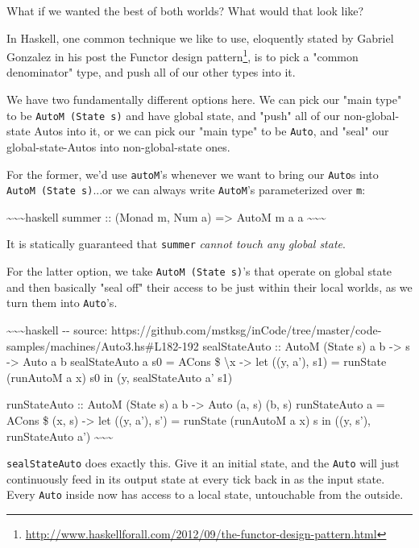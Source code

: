 \documentclass[]{article}
\renewcommand{\href}[2]{#2\footnote{\url{#1}}}
\begin{document}
What if we wanted the best of both worlds? What would that look like?

In Haskell, one common technique we like to use, eloquently stated by Gabriel
Gonzalez in his post
\href{http://www.haskellforall.com/2012/09/the-functor-design-pattern.html}{the
Functor design pattern}, is to pick a "common denominator" type, and push all of
our other types into it.

We have two fundamentally different options here. We can pick our "main type" to
be \texttt{AutoM\ (State\ s)} and have global state, and "push" all of our
non-global-state Autos into it, or we can pick our "main type" to be
\texttt{Auto}, and "seal" our global-state-Autos into non-global-state ones.

For the former, we'd use \texttt{autoM}'s whenever we want to bring our
\texttt{Auto}s into \texttt{AutoM\ (State\ s)}...or we can always write
\texttt{AutoM}'s parameterized over \texttt{m}:

\textasciitilde{}\textasciitilde{}\textasciitilde{}haskell summer :: (Monad m,
Num a) =\textgreater{} AutoM m a a
\textasciitilde{}\textasciitilde{}\textasciitilde{}

It is statically guaranteed that \texttt{summer} \emph{cannot touch any global
state}.

For the latter option, we take \texttt{AutoM\ (State\ s)}'s that operate on
global state and then basically "seal off" their access to be just within their
local worlds, as we turn them into \texttt{Auto}'s.

\textasciitilde{}\textasciitilde{}\textasciitilde{}haskell -\/- source:
https://github.com/mstksg/inCode/tree/master/code-samples/machines/Auto3.hs\#L182-192
sealStateAuto :: AutoM (State s) a b -\textgreater{} s -\textgreater{} Auto a b
sealStateAuto a s0 = ACons \$ \textbackslash{}x -\textgreater{} let ((y, a'),
s1) = runState (runAutoM a x) s0 in (y, sealStateAuto a' s1)

runStateAuto :: AutoM (State s) a b -\textgreater{} Auto (a, s) (b, s)
runStateAuto a = ACons \$ (x, s) -\textgreater{} let ((y, a'), s') = runState
(runAutoM a x) s in ((y, s'), runStateAuto a')
\textasciitilde{}\textasciitilde{}\textasciitilde{}

\texttt{sealStateAuto} does exactly this. Give it an initial state, and the
\texttt{Auto} will just continuously feed in its output state at every tick back
in as the input state. Every \texttt{Auto} inside now has access to a local
state, untouchable from the outside.
\end{document}
